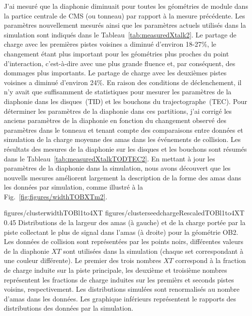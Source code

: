 J'ai mesuré que la diaphonie diminuait pour toutes les géométries de module dans la partice centrale de CMS (ou tonneau) par rapport à la mesure précédente. Les paramètres nouvellement mesurés ainsi que les paramètres actuels utilisés dans la simulation sont indiqués dans le Tableau~\ref{tab:measuredXtalk2}. Le partage de charge avec les premières pistes voisines a diminué d'environ 18-27\%, le changement étant plus important pour les géométries plus proches du point d'interaction, c'est-à-dire avec une plus grande fluence et, par conséquent, des dommages plus importants. Le partage de charge avec les deuxièmes pistes voisines a diminué d'environ 24\%. En raison des conditions de déclenchement, il n'y avait que suffisamment de statistiques pour mesurer les paramètres de la diaphonie dans les disques~(TID) et les bouchons du trajectographe~(TEC). Pour déterminer les paramètres de la diaphonie dans ces partitions, j'ai corrigé les anciens paramètres de la diaphonie en fonction du changement observé des paramètres dans le tonneau et tenant compte des comparaisons entre  données et simulation de la charge moyenne des amas dans les événements de collision. Les résultats des mesures de la diaphonie sur les disques et les bouchons sont résumés dans le Tableau~\ref{tab:measuredXtalkTODTEC2}. En mettant à jour les paramètres de la diaphonie dans la simulation, nous avons découvert que les nouvells mesures améliorent largement la description de la forme des amas dans les données par simulation, comme illustré à la Fig.~\ref{fig:figures/widthTOBXTm2}.

                 {figures/clusterwidthTOBl1to4XT}
                 {figures/clusterseedchargeRescaledTOBl1to4XT} %
                 {0.45}       %
                 {Distributions de la largeur des amas (à gauche) et de la charge portée par la piste collectant le plus de signal dans l'amas (à droite) pour la géométrie OB2. Les données de collision sont représentées par les points noirs, différentes valeurs de la diaphonie $XT$ sont utilisées dans la simulation (chaque set correspondant à une couleur différente). Le premier des trois nombres $XT$ correspond à la fraction de charge induite sur la piste principale, les deuxième et troisième nombres représentent les fractions de charge induites sur les premièrs et seconds pistes voisins, respectivement. Les distributions simulées sont renormalisés au nombre d'amas dans les données. Les graphique inférieurs représentent le rapports des distributions des données par la simulation.}

